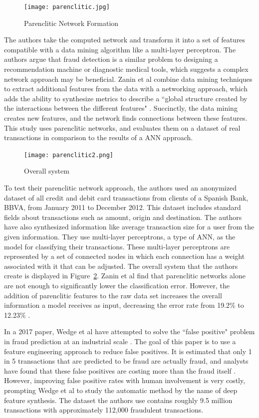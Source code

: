 \documentclass[midd]{thesis}
\begin{document}
\begin{figure}
\centering
  \texttt{[image: parenclitic.jpg]}
  \caption{Parenclitic Network Formation \cite{Boccaletti}}
  \label{fig:parenclitic}
\end{figure}

The authors take the computed network and transform it into a set of features compatible with a data mining algorithm like a multi-layer perceptron.  The authors argue that fraud detection is a similar problem to designing a recommendation machine or diagnostic medical tools, which suggests a complex network approach may be beneficial.  Zanin et al combine data mining techniques to extract additional features from the data with a networking approach, which adds the ability to synthesize metrics to describe a ``global structure created by the interactions between the different features" \cite{Zanin2018}. Succinctly, the data mining creates new features, and the network finds connections between these features.  This study uses parenclitic networks, and evaluates them on a dataset of real transactions in comparison to the results of a ANN approach. 

\begin{figure}
\centering
  \texttt{[image: parenclitic2.png]}
  \caption{Overall system \cite{Zanin2018}}
  \label{fig:parenclitic2}
\end{figure}

To test their parenclitic network approach, the authors used an anonymized dataset of all credit and debit card transactions from clients of a Spanish Bank, BBVA, from January 2011 to December 2012. This dataset includes standard fields about transactions such as amount, origin and destination. The authors have also synthesized information like average transaction size for a user from the given information. They use multi-layer perceptrons, a type of ANN, as the model for classifying their transactions. These multi-layer perceptrons are represented by a set of connected nodes in which each connection has a weight associated with it that can be adjusted. The overall system that the authors create is displayed in Figure~\ref{fig:parenclitic2}. Zanin et al find that parenclitic networks alone are not enough to significantly lower the classification error. However, the addition of parenclitic features to the raw data set increases the overall information a model receives as input, decreasing the error rate from 19.2\% to 12.23\% \cite{Zanin2018}. 

In a 2017 paper, Wedge et al have attempted to solve the ``false positive" problem in fraud prediction at an industrial scale \cite{Wedge}. The goal of this paper is to use a feature engineering approach to reduce false positives. It is estimated that only 1 in 5 transactions that are predicted to be fraud are actually fraud, and analysts have found that these false positives are costing more than the fraud itself \cite{Wedge}. However, improving false positive rates with human involvement is very costly, prompting Wedge et al to study the automatic method by the name of deep feature synthesis. The dataset the authors use contains roughly 9.5 million transactions with approximately 112,000 fraudulent transactions. 
\end{document}

